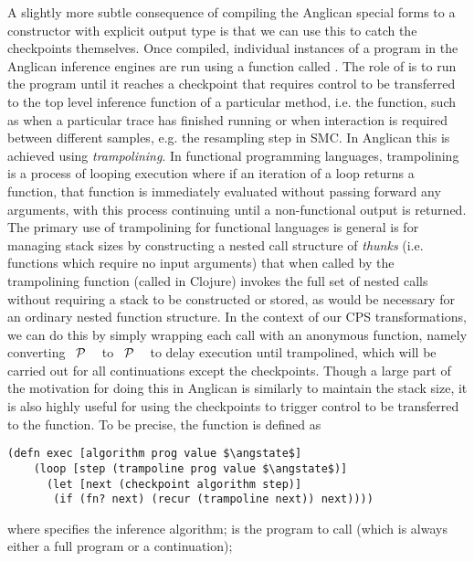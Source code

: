 A slightly more subtle consequence of compiling the Anglican special forms to a constructor with explicit output
type is that
we can use this to catch the checkpoints themselves.  Once compiled, individual instances of
a program in the Anglican inference engines are run using a function called .  The role of
 is to run the program until it reaches a checkpoint that requires control to be transferred
to the top level inference function of a particular method, i.e. the \anginfer function, such as when
a particular trace has finished running or when interaction is required between different samples, e.g. 
the resampling step in SMC.  In Anglican this is achieved using \emph{trampolining}.  In functional
programming languages, trampolining is a process of looping execution where if an iteration of
a loop returns a function, that function is immediately evaluated without passing forward any arguments,
with this process continuing until a non-functional output is returned.  The primary use of trampolining
for functional languages is general 
is for managing stack sizes by constructing a nested call structure of \emph{thunks} (i.e. functions which
require no input arguments) that when called by the trampolining function (called  in Clojure)
invokes the full set of nested calls without requiring a stack to be constructed or stored, as would be necessary
for an ordinary nested function structure.  In the context of our CPS transformations, we can do this by simply
wrapping each call with an anonymous function, namely converting ~$\mathcal{P}$ ~\angstate\clj{)}
to ~$\mathcal{P}$ ~\angstate\clj{))} to delay execution until trampolined, which will be carried out for all continuations
except the checkpoints.  Though a large part of the motivation for doing this in
Anglican is similarly to maintain the stack size, it is also highly useful for using the checkpoints to trigger
control to be transferred to the \anginfer function.  To be precise, the  function is defined as
\begin{lstlisting}[basicstyle=\ttfamily\small,frame=none]
  (defn exec [algorithm prog value $\angstate$]
    (loop [step (trampoline prog value $\angstate$)]
      (let [next (checkpoint algorithm step)]
       (if (fn? next) (recur (trampoline next)) next))))
\end{lstlisting}\vspace{-8pt}
where  specifies the inference algorithm;  is the program to call (which is always either
a full program or a continuation); 

